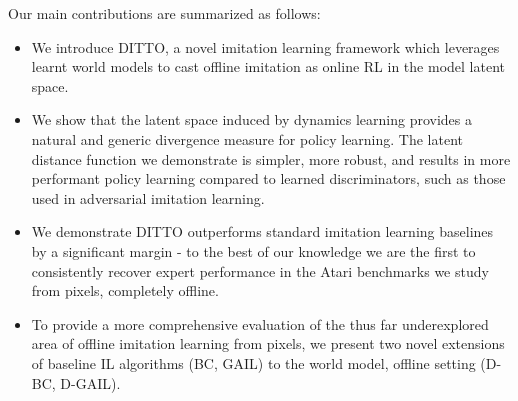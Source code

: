 \documentclass[10pt]{article} %
\theoremstyle{plain}
\theoremstyle{definition}
\theoremstyle{remark}
\begin{document}









Our main contributions are summarized as follows:
\begin{itemize}
    \item We introduce DITTO, a novel imitation learning framework which leverages learnt world models to cast offline imitation as online RL in the model latent space.

    \item We show that the latent space induced by dynamics learning provides a natural and generic divergence measure for policy learning. The latent distance function we demonstrate is simpler, more robust, and results in more performant policy learning compared to learned discriminators, such as those used in adversarial imitation learning.

    \item We demonstrate DITTO outperforms standard imitation learning baselines by a significant margin - to the best of our knowledge we are the first to consistently recover expert performance in the Atari benchmarks we study from pixels, completely offline.
    
    \item To provide a more comprehensive evaluation of the thus far underexplored area of offline imitation learning from pixels, we present two novel extensions of baseline IL algorithms (BC, GAIL) to the world model, offline setting (D-BC, D-GAIL).
\end{itemize}
\end{document}
